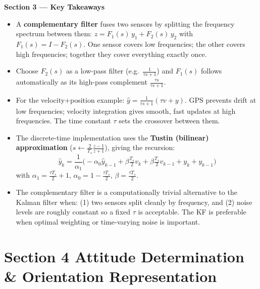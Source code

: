 \documentclass[12pt, a4paper]{article}
\begin{document}
\begin{keybox}
  \textbf{Section 3 --- Key Takeaways}
  \begin{itemize}[leftmargin=1.2em, itemsep=2pt]
    \item A \textbf{complementary filter} fuses two sensors by splitting
      the frequency spectrum between them:
      $z = F_1(s)\,y_1 + F_2(s)\,y_2$ with $F_1(s) = I - F_2(s)$.
      One sensor covers low frequencies; the other covers high
      frequencies; together they cover everything exactly once.

    \item Choose $F_2(s)$ as a low-pass filter (e.g.\
      $\tfrac{1}{\tau s+1}$) and $F_1(s)$ follows automatically as its
      high-pass complement $\tfrac{\tau s}{\tau s+1}$.

    \item For the velocity+position example:
      $\hat{y} = \tfrac{1}{\tau s+1}(\tau v + y)$.
      GPS prevents drift at low frequencies; velocity integration gives
      smooth, fast updates at high frequencies.
      The time constant $\tau$ sets the crossover between them.

    \item The discrete-time implementation uses the
      \textbf{Tustin (bilinear) approximation} ($s \leftarrow
      \tfrac{2}{T_s}\tfrac{z-1}{z+1}$), giving the recursion:
      \[
        \hat{y}_k = \frac{1}{\alpha_1}
          \bigl(-\alpha_0\hat{y}_{k-1}
          + \beta\tfrac{T_s}{2}v_k
          + \beta\tfrac{T_s}{2}v_{k-1}
          + y_k + y_{k-1}\bigr)
      \]
      with $\alpha_1 = \tfrac{\tau T_s}{2}+1$,\;
      $\alpha_0 = 1-\tfrac{\tau T_s}{2}$,\; $\beta = \tfrac{\tau T_s}{2}$.

    \item The complementary filter is a computationally trivial
      alternative to the Kalman filter when: (1) two sensors split cleanly
      by frequency, and (2) noise levels are roughly constant so a fixed
      $\tau$ is acceptable.
      The KF is preferable when optimal weighting or time-varying noise is
      important.
  \end{itemize}
\end{keybox}

\newpage
\section*{Section 4 \quad Attitude Determination \& Orientation Representation}
\end{document}

